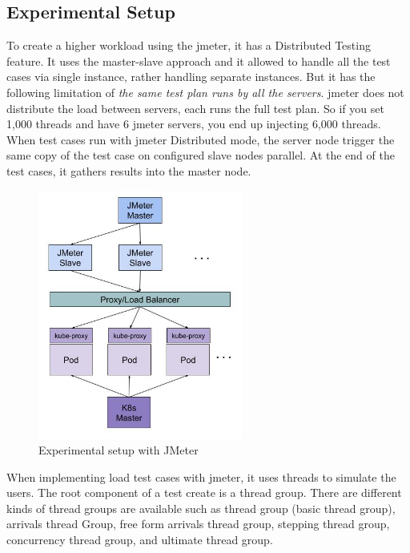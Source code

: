 \subsection{Experimental Setup}
\label{subse:experimental_setup}

To create a higher workload using the \acrshort{jmeter}, it has a Distributed Testing feature. It uses the master-slave approach and it allowed to handle all the test cases via single instance, rather handling separate instances. But it has the following limitation of \emph{the same test plan runs by all the servers}. \acrshort{jmeter} does not distribute the load between servers, each runs the full test plan. So if you set 1,000 threads and have 6 \acrshort{jmeter} servers, you end up injecting 6,000 threads. When test cases run with \acrshort{jmeter} Distributed mode, the server node trigger the same copy of the test case on configured slave nodes parallel. At the end of the test cases, it gathers results into the master node.

\begin{figure}[htp]
    \centering
    \includegraphics[width=0.6\textwidth]{results/work_load/experimental_setup_v3.jpg}
    \caption{Experimental setup with JMeter}
    \label{fi:experimental_setup}
\end{figure}

When implementing load test cases with \acrshort{jmeter}, it uses threads to simulate the users. The root component of a test create is a thread group. There are different kinds of thread groups are available such as thread group (basic thread group), arrivals thread Group, free form arrivals thread group, stepping thread group, concurrency thread group, and ultimate thread group.


